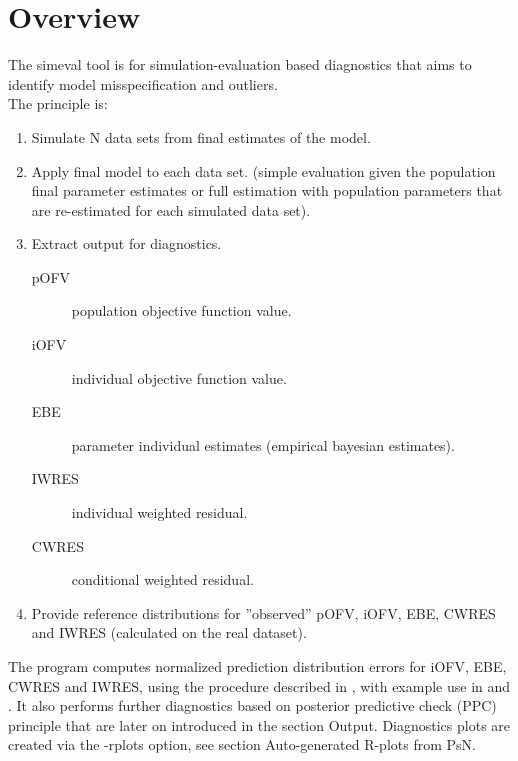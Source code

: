 
\usepackage{hyperref}


\maketitle
\newcommand{\guidetoolname}{simeval}
\tableofcontents
\newpage

\section{Overview}

The simeval tool is for simulation-evaluation based diagnostics that aims to identify model misspecification and outliers.\\
The principle is:
\begin{enumerate}
\item Simulate N data sets from final estimates of the model.
\item Apply final model to each data set.
(simple evaluation given the population final parameter estimates or full estimation with population parameters that are re-estimated for each simulated data set).
\item Extract output for diagnostics.
\begin{description}
\item[pOFV] population objective function value.
\item[iOFV] individual objective function value.
\item[EBE] parameter individual estimates (empirical bayesian estimates).
\item[IWRES] individual weighted residual.
\item[CWRES] conditional weighted residual.
\end{description}
\item Provide reference distributions for ”observed” pOFV, iOFV, EBE, CWRES and IWRES (calculated on the real dataset).
\end{enumerate}
The program computes normalized prediction distribution errors for iOFV, EBE, CWRES and IWRES, using the procedure described in \cite{Comets}, with example use in \cite{Keizer} and \cite{Largajolli}. It also performs further diagnostics based on posterior predictive check (PPC) principle that are later on introduced in the section Output. Diagnostics plots are created via the -rplots option, see section Auto-generated R-plots from PsN.\\


